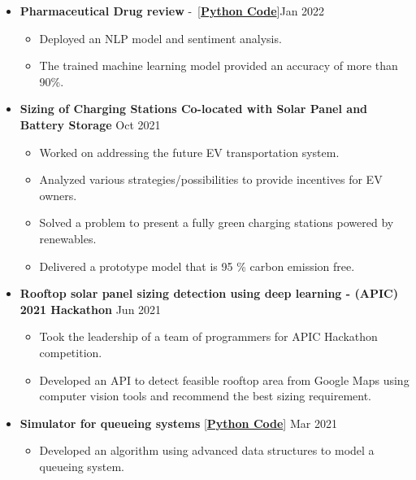 \documentclass[11pt,a4paper,sans]{moderncv} %
\begin{document}
\begin{itemize}
\begin{itemize}
		\item \textbf{Pharmaceutical Drug review} -~[\href{https://github.com/Hadi2525/applied_ML/blob/master/Pharma/drug_model.ipynb}{\textbf{Python Code}}]\hfill Jan 2022
		\begin{itemize}
			\item Deployed an NLP model and sentiment analysis.
			\item The trained machine learning model provided an accuracy of more than 90\%.
		\end{itemize}
		\item  \textbf{Sizing of Charging Stations Co-located with Solar Panel and Battery Storage} \hfill Oct 2021
		\begin{itemize}
			\item Worked on addressing the future EV transportation system.
			\item Analyzed various strategies/possibilities to provide incentives for EV owners.
			\item Solved a problem to present a fully green charging stations powered by renewables.
			\item Delivered a prototype model that is 95 \% carbon emission free.
		\end{itemize}
		\item \textbf{Rooftop solar panel sizing detection using deep learning - (APIC) 2021 Hackathon} \hfill Jun 2021
		\begin{itemize}
			\item Took the leadership of a team of programmers for APIC Hackathon competition.
			\item Developed an API to detect feasible rooftop area from Google Maps using computer vision tools and recommend the best sizing requirement. 
		\end{itemize}
		\item\textbf{ Simulator for queueing systems} [\href{https://github.com/Hadi2525/queueing_theory}{\textbf{Python Code}}] \hfill Mar 2021
		\begin{itemize}
			\item Developed an algorithm using advanced data structures to model a queueing system.
		\end{itemize}
	\end{itemize}
	\end{itemize}
	

\end{document}

